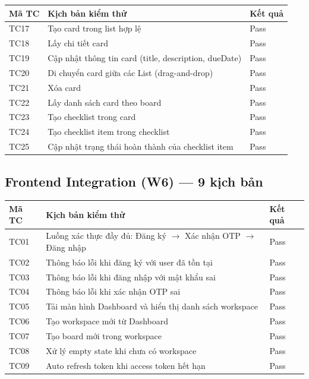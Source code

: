 \begin{table}[H]
\centering
\begin{tabularx}{\textwidth}{|l|X|l|}
\hline
\rowcolor{gray!20}
\textbf{Mã TC} & \textbf{Kịch bản kiểm thử} & \textbf{Kết quả} \\
\hline
TC17 & Tạo card trong list hợp lệ & Pass \\
\hline
TC18 & Lấy chi tiết card & Pass \\
\hline
TC19 & Cập nhật thông tin card (title, description, dueDate) & Pass \\
\hline
TC20 & Di chuyển card giữa các List (drag-and-drop) & Pass \\
\hline
TC21 & Xóa card & Pass \\
\hline
TC22 & Lấy danh sách card theo board & Pass \\
\hline
TC23 & Tạo checklist trong card & Pass \\
\hline
TC24 & Tạo checklist item trong checklist & Pass \\
\hline
TC25 & Cập nhật trạng thái hoàn thành của checklist item & Pass \\
\hline
\end{tabularx}
\end{table}

\subsection*{Frontend Integration (W6) — 9 kịch bản}

\begin{table}[H]
\centering
\begin{tabularx}{\textwidth}{|l|X|l|}
\hline
\rowcolor{gray!20}
\textbf{Mã TC} & \textbf{Kịch bản kiểm thử} & \textbf{Kết quả} \\
\hline
TC01 & Luồng xác thực đầy đủ: Đăng ký $\rightarrow$ Xác nhận OTP $\rightarrow$ Đăng nhập & Pass \\
\hline
TC02 & Thông báo lỗi khi đăng ký với user đã tồn tại & Pass \\
\hline
TC03 & Thông báo lỗi khi đăng nhập với mật khẩu sai & Pass \\
\hline
TC04 & Thông báo lỗi khi xác nhận OTP sai & Pass \\
\hline
TC05 & Tải màn hình Dashboard và hiển thị danh sách workspace & Pass \\
\hline
TC06 & Tạo workspace mới từ Dashboard & Pass \\
\hline
TC07 & Tạo board mới trong workspace & Pass \\
\hline
TC08 & Xử lý empty state khi chưa có workspace & Pass \\
\hline
TC09 & Auto refresh token khi access token hết hạn & Pass \\
\hline
\end{tabularx}
\end{table}

